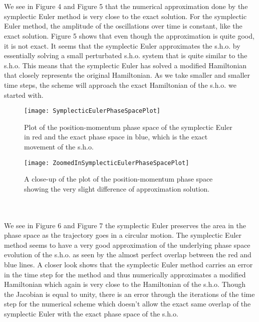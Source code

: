 \documentclass[12pt]{article}
\begin{document}
\\\\\indent We see in Figure 4 and Figure 5 that the numerical approximation done by the symplectic Euler method is very close to the exact solution. For the symplectic Euler method, the amplitude of the oscillations over time is constant, like the exact solution. Figure 5 shows that even though the approximation is quite good, it is not exact. It seems that the symplectic Euler approximates the s.h.o. by essentially solving a small perturbated s.h.o. system that is quite similar to the s.h.o. This means that the symplectic Euler has solved a modified Hamiltonian that closely represents the original Hamiltonian. As we take smaller and smaller time steps, the scheme will approach the exact Hamiltonian of the s.h.o. we started with. 
\begin{figure}[h!]
\begin{minipage}[b]{0.45\linewidth}
\centering
\texttt{[image: SymplecticEulerPhaseSpacePlot]}
\caption{Plot of the position-momentum phase space of the symplectic Euler in red and the exact phase space in blue, which is the exact movement of the s.h.o.}
\label{fig:figure6}
\end{minipage}
\hspace{0.5cm}
\begin{minipage}[b]{0.45\linewidth}
\centering
\texttt{[image: ZoomedInSymplecticEulerPhaseSpacePlot]}
\caption{A close-up of the plot of the position-momentum phase space showing the very slight difference of approximation solution.}
\label{fig:figure7}
\end{minipage}
\end{figure}
\\\\\indent We see in Figure 6 and Figure 7 the symplectic Euler preserves the area in the phase space as the trajectory goes in a circular motion. The symplectic Euler method seems to have a very good approximation of the underlying phase space evolution of the s.h.o. as seen by the almost perfect overlap between the red and blue lines. A closer look shows that the symplectic Euler method carries an error in the time step for the method and thus numerically approximates a modified Hamiltonian which again is very close to the Hamiltonian of the s.h.o. Though the Jacobian is equal to unity, there is an error through the iterations of the time step for the numerical scheme which doesn't allow the exact same overlap of the symplectic Euler with the exact phase space of the s.h.o.\\\\
\end{document}
